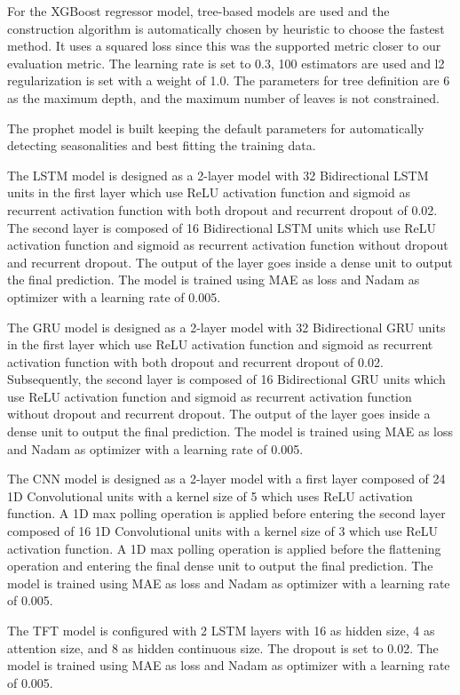For the XGBoost regressor model, tree-based models are used and the construction algorithm is automatically chosen by heuristic to choose the fastest method.
It uses a squared loss since this was the supported metric closer to our evaluation metric.
The learning rate is set to 0.3, 100 estimators are used and l2 regularization is set with a weight of 1.0.
The parameters for tree definition are 6 as the maximum depth, and the maximum number of leaves is not constrained.

The prophet model is built keeping the default parameters for automatically detecting seasonalities and best fitting the training data.

The LSTM model is designed as a 2-layer model with 32 Bidirectional LSTM units in the first layer which use ReLU activation function and sigmoid as recurrent activation function with both dropout and recurrent dropout of 0.02.
The second layer is composed of 16 Bidirectional LSTM units which use ReLU activation function and sigmoid as recurrent activation function without dropout and recurrent dropout.
The output of the layer goes inside a dense unit to output the final prediction.
The model is trained using MAE as loss and Nadam as optimizer with a learning rate of 0.005.

The GRU model is designed as a 2-layer model with 32 Bidirectional GRU units in the first layer which use ReLU activation function and sigmoid as recurrent activation function with both dropout and recurrent dropout of 0.02.
Subsequently, the second layer is composed of 16 Bidirectional GRU units which use ReLU activation function and sigmoid as recurrent activation function without dropout and recurrent dropout.
The output of the layer goes inside a dense unit to output the final prediction.
The model is trained using MAE as loss and Nadam as optimizer with a learning rate of 0.005.

The CNN model is designed as a 2-layer model with a first layer composed of 24 1D Convolutional units with a kernel size of 5 which uses ReLU activation function.
A 1D max polling operation is applied before entering the second layer composed of 16 1D Convolutional units with a kernel size of 3 which use ReLU activation function.
A 1D max polling operation is applied before the flattening operation and entering the final dense unit to output the final prediction.
The model is trained using MAE as loss and Nadam as optimizer with a learning rate of 0.005.

The TFT model is configured with 2 LSTM layers with 16 as hidden size, 4 as attention size, and 8 as hidden continuous size.
The dropout is set to 0.02.
The model is trained using MAE as loss and Nadam as optimizer with a learning rate of 0.005.

